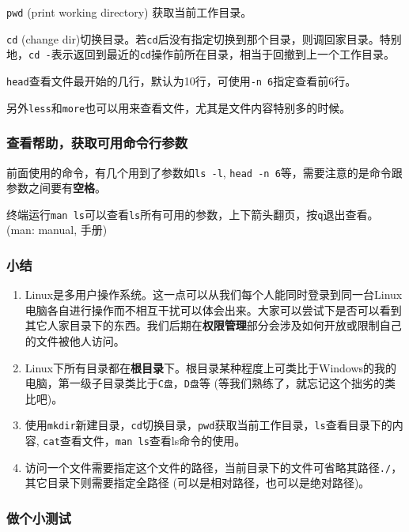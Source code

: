 \documentclass[]{article}
\numberwithin{figure}{section}
\numberwithin{table}{section}
\begin{document}
\texttt{pwd} (print working directory) 获取当前工作目录。

\texttt{cd} (change dir)切换目录。若\texttt{cd}后没有指定切换到那个目录，则调回家目录。特别地，\texttt{cd\ -}表示返回到最近的\texttt{cd}操作前所在目录，相当于回撤到上一个工作目录。

\texttt{head}查看文件最开始的几行，默认为10行，可使用\texttt{-n\ 6}指定查看前6行。

另外\texttt{less}和\texttt{more}也可以用来查看文件，尤其是文件内容特别多的时候。

\hypertarget{com_parameter_help}{%
\subsubsection{查看帮助，获取可用命令行参数}\label{com_parameter_help}}

前面使用的命令，有几个用到了参数如\texttt{ls\ -l}, \texttt{head\ -n\ 6}等，需要注意的是命令跟参数之间要有\textbf{空格}。

终端运行\texttt{man\ ls}可以查看\texttt{ls}所有可用的参数，上下箭头翻页，按\texttt{q}退出查看。(man: manual, 手册)

\hypertarget{first_summary}{%
\subsubsection{小结}\label{first_summary}}

\begin{enumerate}
\def\labelenumi{\arabic{enumi}.}
\item
  Linux是多用户操作系统。这一点可以从我们每个人能同时登录到同一台Linux电脑各自进行操作而不相互干扰可以体会出来。大家可以尝试下是否可以看到其它人家目录下的东西。我们后期在\textbf{权限管理}部分会涉及如何开放或限制自己的文件被他人访问。
\item
  Linux下所有目录都在\textbf{根目录}下。根目录某种程度上可类比于Windows的我的电脑，第一级子目录类比于\texttt{C盘}，\texttt{D盘}等 (等我们熟练了，就忘记这个拙劣的类比吧)。
\item
  使用\texttt{mkdir}新建目录，\texttt{cd}切换目录，\texttt{pwd}获取当前工作目录，\texttt{ls}查看目录下的内容, \texttt{cat}查看文件，\texttt{man\ ls}查看ls命令的使用。
\item
  访问一个文件需要指定这个文件的路径，当前目录下的文件可省略其路径\texttt{./}，其它目录下则需要指定全路径 (可以是相对路径，也可以是绝对路径)。
\end{enumerate}

\hypertarget{first_exercise}{%
\subsubsection{做个小测试}\label{first_exercise}}
\end{document}
